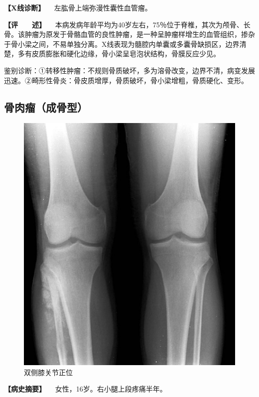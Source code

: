 \textbf{【X线诊断】} 　左肱骨上端弥漫性囊性血管瘤。

\textbf{【评　　述】}
　本病发病年龄平均为40岁左右，75％位于脊椎，其次为颅骨、长骨。该肿瘤为原发于骨骼血管的良性肿瘤，是一种呈肿瘤样增生的血管组织，掺杂于骨小梁之间，不易单独分离。X线表现为髓腔内单囊或多囊骨缺损区，边界清楚，多有皮质膨胀和硬化边缘，骨小梁呈皂泡状结构，骨膜反应少见。

鉴别诊断：①转移性肿瘤：不规则骨质破坏，多为溶骨改变，边界不清，病变发展迅速。②畸形性骨炎：骨皮质增厚，骨质破坏，骨小梁增粗，骨质硬化、变形。

\subsection{骨肉瘤（成骨型）}

\begin{figure}[!htbp]
 \centering
 \includegraphics{./images/Image00098.jpg}
 \captionsetup{justification=centering}
 \caption{双侧膝关节正位}
 \label{fig2-7-13}
  \end{figure} 

\textbf{【病史摘要】} 　女性，16岁。右小腿上段疼痛半年。


